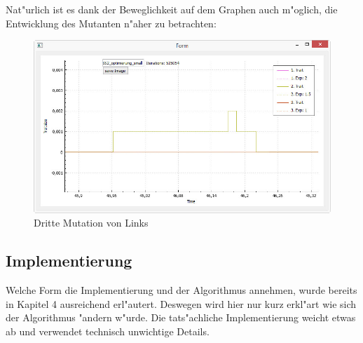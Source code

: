 \documentclass[11pt, a4paper, german]{article}
\theoremstyle{plain}
\begin{document}
	Nat"urlich ist es dank der Beweglichkeit auf dem Graphen auch m"oglich, die Entwicklung des Mutanten n"aher zu betrachten:
	\begin{figure}[H]
		\centering
		\includegraphics[width=1\linewidth]{./Pictures/TSS_MutationZoom2_original}
		\caption{Dritte Mutation von Links}
		\label{TSS_MutationZoom2_original}
	\end{figure}
	
	\subsection{Implementierung}
	Welche Form die Implementierung und der Algorithmus annehmen, wurde bereits in Kapitel 4 ausreichend erl"autert. Deswegen wird hier nur kurz erkl"art wie sich der Algorithmus "andern w"urde. Die tats"achliche Implementierung weicht etwas ab und verwendet technisch unwichtige Details.\\
	
\end{document}
